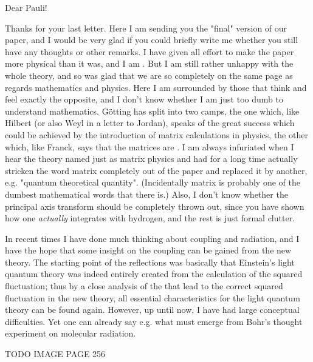 \date{November 16, 1925}

Dear Pauli! 

Thanks for your last letter. Here I am sending you the "final" version of our paper, and I would be very glad if you could briefly write me whether you still have any thoughts or other remarks. I have given all effort to make the paper more physical than it was, and I am . But I am still rather unhappy with the whole theory, and so was glad that we are so completely on the same page as regards mathematics and physics. Here I am surrounded by those that think and feel exactly the opposite, and I don't know whether I am just too dumb to understand mathematics. G\"otting has split into two camps, the one which, like Hilbert (or also Weyl in a letter to Jordan), speaks of the great success which could be achieved by the introduction of matrix calculations in physics, the other which, like Franck, says that the matrices are . I am always infuriated when I hear the theory named just as matrix physics and had for a long time actually stricken the word matrix completely out of the paper and replaced it by another, e.g. "quantum theoretical quantity". (Incidentally matrix is probably one of the dumbest mathematical words that there is.) Also, I don't know whether the principal axis transform should be completely thrown out, since you have shown how one \textit{actually} integrates with hydrogen, and the rest is just formal clutter.

In recent times I have done much thinking about coupling and radiation, and I have the hope that some insight on the coupling can be gained from the new theory. The starting point of the reflections was basically that Einstein's light quantum theory was indeed entirely created from the calculation of the squared fluctuation; thus by a close analysis of the  that lead to the correct squared fluctuation in the new theory, all essential characteristics for the light quantum theory can be found again. However, up until now, I have had large conceptual difficulties. Yet one can already say e.g. what must emerge from Bohr's thought experiment on molecular radiation.

TODO IMAGE PAGE 256


